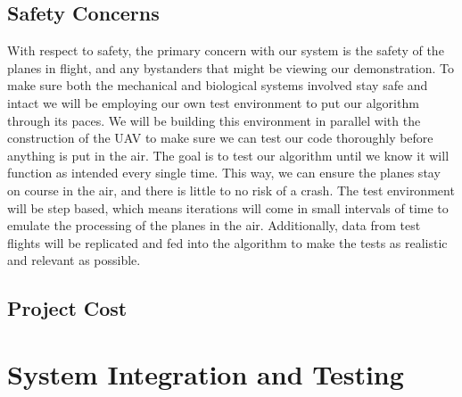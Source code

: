 \documentclass[12pt]{article}
\begin{document}
\subsection{Safety Concerns}
With respect to safety, the primary concern with our system is the safety of the planes in flight, and any bystanders that might be viewing our demonstration. To make sure both the mechanical and biological systems involved stay safe and intact we will be employing our own test environment to put our algorithm through its paces. We will be building this environment in parallel with the construction of the UAV to make sure we can test our code thoroughly before anything is put in the air. The goal is to test our algorithm until we know it will function as intended every single time. This way, we can ensure the planes stay on course in the air, and there is little to no risk of a crash. The test environment will be step based, which means iterations will come in small intervals of time to emulate the processing of the planes in the air. Additionally, data from test flights will be replicated and fed into the algorithm to make the tests as realistic and relevant as possible.

\subsection{Project Cost}

\section{System Integration and Testing}
\end{document}
